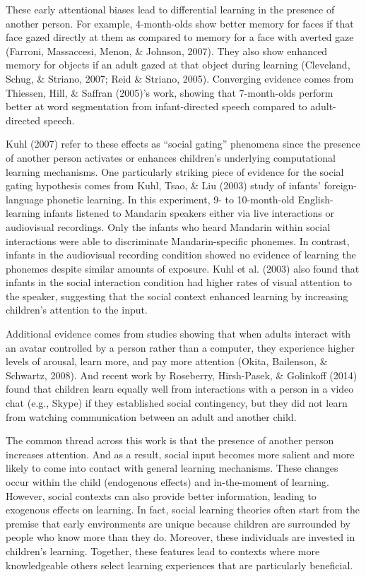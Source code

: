 \documentclass[oneside]{report}
\begin{document}
These early attentional biases lead to differential learning in the
presence of another person. For example, 4-month-olds show better memory
for faces if that face gazed directly at them as compared to memory for
a face with averted gaze (Farroni, Massaccesi, Menon, \& Johnson, 2007).
They also show enhanced memory for objects if an adult gazed at that
object during learning (Cleveland, Schug, \& Striano, 2007; Reid \&
Striano, 2005). Converging evidence comes from Thiessen, Hill, \&
Saffran (2005)'s work, showing that 7-month-olds perform better at word
segmentation from infant-directed speech compared to adult-directed
speech.

Kuhl (2007) refer to these effects as ``social gating'' phenomena since
the presence of another person activates or enhances children's
underlying computational learning mechanisms. One particularly striking
piece of evidence for the social gating hypothesis comes from Kuhl,
Tsao, \& Liu (2003) study of infants' foreign-language phonetic
learning. In this experiment, 9- to 10-month-old English-learning
infants listened to Mandarin speakers either via live interactions or
audiovisual recordings. Only the infants who heard Mandarin within
social interactions were able to discriminate Mandarin-specific
phonemes. In contrast, infants in the audiovisual recording condition
showed no evidence of learning the phonemes despite similar amounts of
exposure. Kuhl et al. (2003) also found that infants in the social
interaction condition had higher rates of visual attention to the
speaker, suggesting that the social context enhanced learning by
increasing children's attention to the input.

Additional evidence comes from studies showing that when adults interact
with an avatar controlled by a person rather than a computer, they
experience higher levels of arousal, learn more, and pay more attention
(Okita, Bailenson, \& Schwartz, 2008). And recent work by Roseberry,
Hirsh-Pasek, \& Golinkoff (2014) found that children learn equally well
from interactions with a person in a video chat (e.g., Skype) if they
established social contingency, but they did not learn from watching
communication between an adult and another child.

The common thread across this work is that the presence of another
person increases attention. And as a result, social input becomes more
salient and more likely to come into contact with general learning
mechanisms. These changes occur within the child (endogenous effects)
and in-the-moment of learning. However, social contexts can also provide
better information, leading to exogenous effects on learning. In fact,
social learning theories often start from the premise that early
environments are unique because children are surrounded by people who
know more than they do. Moreover, these individuals are invested in
children's learning. Together, these features lead to contexts where
more knowledgeable others select learning experiences that are
particularly beneficial.
\end{document}
